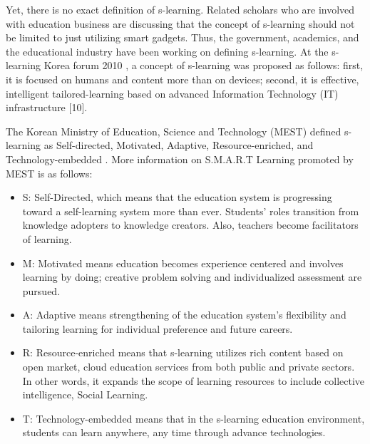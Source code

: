 \documentclass[journal]{vgtc}
\begin{document}
Yet, there is no exact definition of s-learning. Related scholars who are involved with education business are discussing that the concept of s-learning should not be limited to just utilizing smart gadgets. Thus, the government, academics, and the educational industry have been working on defining s-learning. At the s-learning Korea forum 2010 \cite{Kim2013a}, a concept of s-learning was proposed as follows: first, it is focused on humans and content more than on devices; second, it is effective, intelligent tailored-learning based on advanced Information Technology (IT) infrastructure [10].

The Korean Ministry of Education, Science and Technology (MEST) defined s-learning as Self-directed, Motivated, Adaptive, Resource-enriched, and Technology-embedded \cite{mest}. More information on S.M.A.R.T Learning promoted by MEST is as follows:
\begin{itemize}
  \setlength\itemsep{-0.5em}
  \item S: Self-Directed, which means that the education system is progressing toward a self-learning system more than ever. Students' roles transition from knowledge adopters to knowledge creators. Also, teachers become facilitators of learning.
  \item M: Motivated means education becomes experience centered and involves learning by doing; creative problem solving and individualized assessment are pursued.
  \item A: Adaptive means strengthening of the education system's flexibility and tailoring learning for individual preference and future careers.
  \item R: Resource-enriched means that s-learning utilizes rich content based on open market, cloud education services from both public and private sectors. In other words, it expands the scope of learning resources to include collective intelligence, Social Learning.
  \item T: Technology-embedded means that in the s-learning education environment, students can learn anywhere, any time through advance technologies.
\end{itemize}
\end{document}
